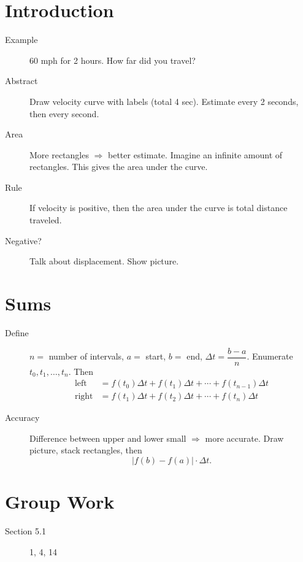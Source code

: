 \documentclass[11pt]{article}
\begin{document}
\drawtitle

\section*{Introduction}
\begin{description}
\item[Example] 60 mph for 2 hours.  How far did you travel?
\item[Abstract] Draw velocity curve with labels (total 4
  sec). Estimate every 2 seconds, then every second.
\item[Area] More rectangles $\Rightarrow$ better estimate.  Imagine an
  infinite amount of rectangles.  This gives the area under the curve.
\item[Rule] If velocity is positive, then the area under the curve is
  total distance traveled.
\item[Negative?] Talk about displacement.  Show picture.
\end{description}

\section*{Sums}
\begin{description}
\item[Define] $n=$ number of intervals, $a=$ start, $b=$ end, $\Delta
  t=\dfrac{b-a}{n}$.  Enumerate $t_0, t_1, \dots, t_n$.  Then
  \begin{align*}
    \mbox{left} &= f(t_0)\Delta t + f(t_1)\Delta t + \cdots +
    f(t_{n-1})\Delta t\\
    \mbox{right} &= f(t_1)\Delta t + f(t_2)\Delta t + \cdots +
    f(t_{n})\Delta t
  \end{align*}
\item[Accuracy] Difference between upper and lower small $\Rightarrow$ more
  accurate.  Draw picture, stack rectangles, then
  \[
  |f(b)-f(a)|\cdot\Delta t.
  \]
\end{description}

\section*{Group Work}
\begin{description}
\item[Section 5.1] 1, 4, 14
\end{description}
\end{document}
